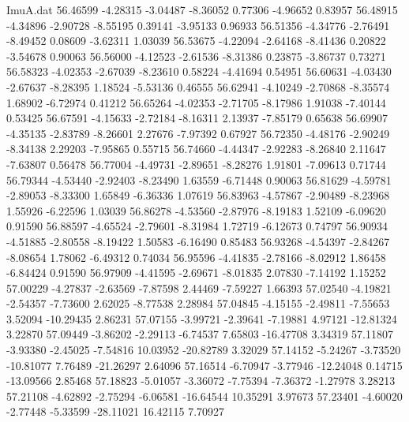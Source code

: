 \begin{filecontents}{ImuA.dat}
  56.46599   -4.28315   -3.04487   -8.36052    0.77306   -4.96652    0.83957
  56.48915   -4.34896   -2.90728   -8.55195    0.39141   -3.95133    0.96933
  56.51356   -4.34776   -2.76491   -8.49452    0.08609   -3.62311    1.03039
  56.53675   -4.22094   -2.64168   -8.41436    0.20822   -3.54678    0.90063
  56.56000   -4.12523   -2.61536   -8.31386    0.23875   -3.86737    0.73271
  56.58323   -4.02353   -2.67039   -8.23610    0.58224   -4.41694    0.54951
  56.60631   -4.03430   -2.67637   -8.28395    1.18524   -5.53136    0.46555
  56.62941   -4.10249   -2.70868   -8.35574    1.68902   -6.72974    0.41212
  56.65264   -4.02353   -2.71705   -8.17986    1.91038   -7.40144    0.53425
  56.67591   -4.15633   -2.72184   -8.16311    2.13937   -7.85179    0.65638
  56.69907   -4.35135   -2.83789   -8.26601    2.27676   -7.97392    0.67927
  56.72350   -4.48176   -2.90249   -8.34138    2.29203   -7.95865    0.55715
  56.74660   -4.44347   -2.92283   -8.26840    2.11647   -7.63807    0.56478
  56.77004   -4.49731   -2.89651   -8.28276    1.91801   -7.09613    0.71744
  56.79344   -4.53440   -2.92403   -8.23490    1.63559   -6.71448    0.90063
  56.81629   -4.59781   -2.89053   -8.33300    1.65849   -6.36336    1.07619
  56.83963   -4.57867   -2.90489   -8.23968    1.55926   -6.22596    1.03039
  56.86278   -4.53560   -2.87976   -8.19183    1.52109   -6.09620    0.91590
  56.88597   -4.65524   -2.79601   -8.31984    1.72719   -6.12673    0.74797
  56.90934   -4.51885   -2.80558   -8.19422    1.50583   -6.16490    0.85483
  56.93268   -4.54397   -2.84267   -8.08654    1.78062   -6.49312    0.74034
  56.95596   -4.41835   -2.78166   -8.02912    1.86458   -6.84424    0.91590
  56.97909   -4.41595   -2.69671   -8.01835    2.07830   -7.14192    1.15252
  57.00229   -4.27837   -2.63569   -7.87598    2.44469   -7.59227    1.66393
  57.02540   -4.19821   -2.54357   -7.73600    2.62025   -8.77538    2.28984
  57.04845   -4.15155   -2.49811   -7.55653    3.52094  -10.29435    2.86231
  57.07155   -3.99721   -2.39641   -7.19881    4.97121  -12.81324    3.22870
  57.09449   -3.86202   -2.29113   -6.74537    7.65803  -16.47708    3.34319
  57.11807   -3.93380   -2.45025   -7.54816   10.03952  -20.82789    3.32029
  57.14152   -5.24267   -3.73520  -10.81077    7.76489  -21.26297    2.64096
  57.16514   -6.70947   -3.77946  -12.24048    0.14715  -13.09566    2.85468
  57.18823   -5.01057   -3.36072   -7.75394   -7.36372   -1.27978    3.28213
  57.21108   -4.62892   -2.75294   -6.06581  -16.64544   10.35291    3.97673
  57.23401   -4.60020   -2.77448   -5.33599  -28.11021   16.42115    7.70927

\end{filecontents}
